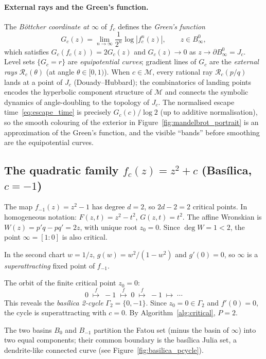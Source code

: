 \documentclass[12pt]{article}
\theoremstyle{definition}
\begin{document}
\paragraph{External rays and the Green's function.}
The \emph{B\"ottcher coordinate at $\infty$} of $f_c$ defines the
\emph{Green's function}
\[
  G_c(z) = \lim_{n\to\infty} \frac{1}{2^n}\log|f_c^n(z)|,
  \qquad z\in B^0_\infty,
\]
which satisfies $G_c(f_c(z))=2G_c(z)$ and $G_c(z)\to 0$ as
$z\to\partial B^0_\infty=J_c$.  Level sets $\{G_c=r\}$ are
\emph{equipotential curves}; gradient lines of $G_c$ are the
\emph{external rays} $\mathcal{R}_c(\theta)$ (at angle $\theta\in[0,1)$).
When $c\in\mathcal{M}$, every rational ray $\mathcal{R}_c(p/q)$ lands
at a point of $J_c$ (Douady--Hubbard); the combinatorics of landing
points encodes the hyperbolic component structure of $\mathcal{M}$ and
connects the symbolic dynamics of angle-doubling to the topology of
$J_c$.  The normalised escape time~\eqref{eq:escape_time} is precisely
$G_c(c)/\log 2$ (up to additive normalisation), so the smooth colouring
of the exterior in Figure~\ref{fig:mandelbrot_portrait} is an approximation
of the Green's function, and the visible ``bands'' before smoothing are
the equipotential curves.

\subsection{The quadratic family $f_c(z)=z^2+c$ (Bas\'ilica, $c=-1$)}
\label{subsec:basilica}

The map $f_{-1}(z)=z^2-1$ has degree $d=2$, so $2d-2=2$ critical points.
In homogeneous notation: $F(z,t) = z^2-t^2$, $G(z,t)=t^2$.
The affine Wronskian is $W(z)=p'q-pq'=2z$, with unique root $z_0=0$.
Since $\deg W=1<2$, the point $\infty=[1:0]$ is also critical.

In the second chart $w=1/z$, $g(w)=w^2/(1-w^2)$ and $g'(0)=0$, so
$\infty$ is a \emph{superattracting} fixed point of $f_{-1}$.

The orbit of the finite critical point $z_0=0$:
\[
  0\;\overset{f}{\longmapsto}\;-1\;\overset{f}{\longmapsto}\;0
  \;\overset{f}{\longmapsto}\;-1\;\longmapsto\;\cdots
\]
This reveals the \emph{bas\'ilica 2-cycle} $\Gamma_2=\{0,-1\}$.  Since
$z_0=0\in\Gamma_2$ and $f'(0)=0$, the cycle is superattracting with $c=0$.
By Algorithm~\ref{alg:critical}, $P=2$.

The two basins $B_0$ and $B_{-1}$ partition the Fatou set (minus the
basin of $\infty$) into two equal components; their common boundary is
the bas\'ilica Julia set, a dendrite-like connected curve
(see Figure~\ref{fig:basilica_pcycle}).
\end{document}
